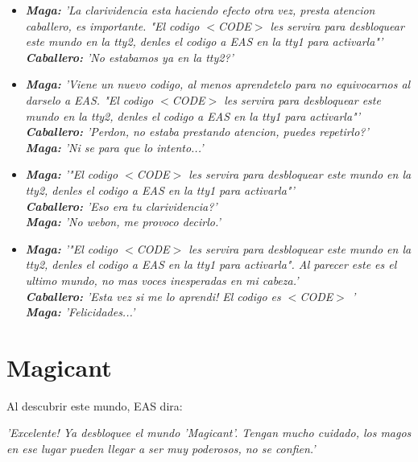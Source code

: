 \documentclass[a4paper,10pt]{article}
\begin{document}
	\begin{itemize}
		\item \textit{\textbf{Maga:} 'La clarividencia esta haciendo efecto otra vez, presta atencion caballero, es importante. "El codigo $<$CODE$>$ les servira para desbloquear este mundo en la tty2, denles el codigo a EAS en la tty1 para activarla"'\\}
		\textit{\textbf{Caballero:} 'No estabamos ya en la tty2?'\\}
		
		\item \textit{\textbf{Maga:} 'Viene un nuevo codigo, al menos aprendetelo para no equivocarnos al darselo a EAS.  "El codigo $<$CODE$>$ les servira para desbloquear este mundo en la tty2, denles el codigo a EAS en la tty1 para activarla"'\\}
		\textit{\textbf{Caballero:} 'Perdon, no estaba prestando atencion, puedes repetirlo?'\\}
		\textit{\textbf{Maga:} 'Ni se para que lo intento...'\\}
		
		\item \textit{\textbf{Maga:} '"El codigo $<$CODE$>$ les servira para desbloquear este mundo en la tty2, denles el codigo a EAS en la tty1 para activarla"'\\}
		\textit{\textbf{Caballero:} 'Eso era tu clarividencia?'\\}
		\textit{\textbf{Maga:} 'No webon, me provoco decirlo.'\\}
		
		\item \textit{\textbf{Maga:} '"El codigo $<$CODE$>$ les servira para desbloquear este mundo en la tty2, denles el codigo a EAS en la tty1 para activarla". Al parecer este es el ultimo mundo, no mas voces inesperadas en mi cabeza.'\\}
		\textit{\textbf{Caballero:} 'Esta vez si me lo aprendi! El codigo es $<$CODE$>$
'\\}
		\textit{\textbf{Maga:} 'Felicidades...'\\}
		
	\end{itemize}
\section{Magicant}
	Al descubrir este mundo, EAS dira:
	
	\textit{'Excelente! Ya desbloquee el mundo 'Magicant'. Tengan mucho cuidado, los magos en ese lugar pueden llegar a ser muy poderosos, no se confien.'\\}	
	
\end{document}
